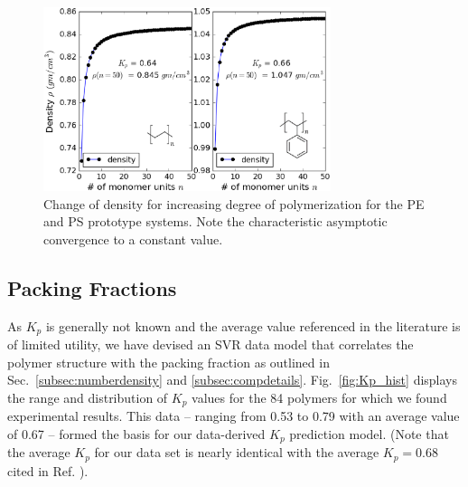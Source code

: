\begin{figure}[htbp] 
	\centering
	\includegraphics[width=0.75\textwidth]{Chapter-2/Figures/plot_den.eps}
	\caption{Change of density for increasing degree of polymerization for the PE and PS prototype systems. Note the characteristic asymptotic convergence to a constant value.}
	\label{fig:den_ex} 
\end{figure} 



\subsection{Packing Fractions}
\label{subsec:packingfractions_results}
As $K_p$ is generally not known and the average value referenced in the literature \cite{askadski2003} is of limited utility, we have devised an SVR data model that correlates the polymer structure with the packing fraction as outlined in Sec.\ \ref{subsec:numberdensity} and \ref{subsec:compdetails}.
Fig.\ \ref{fig:Kp_hist} displays the range and distribution of $K_p$ values for the 84 polymers for which we found experimental results. 
This data -- ranging from 0.53 to 0.79 with an average value of 0.67 -- formed the basis for our data-derived $K_p$ prediction model. (Note that the average $K_p$ for our data set is nearly identical with the average $K_p=0.68$ cited in Ref. \cite{askadski2003}). 


